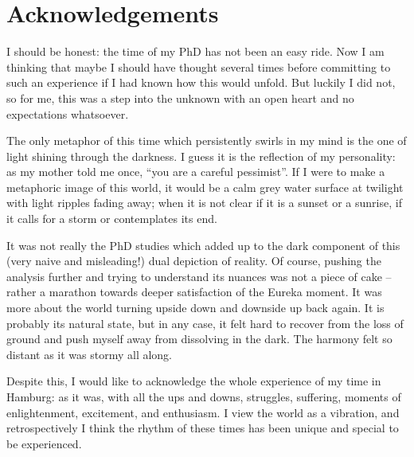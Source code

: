 \thispagestyle{empty}
\vspace{-3cm}
\section*{\centering Acknowledgements}

I should be honest: the time of my PhD has not been an easy ride. Now I am thinking that maybe I should have thought several times before committing to such an experience if I had known how this would unfold. But luckily I did not, so for me, this was a step into the unknown with an open heart and no expectations whatsoever.

The only metaphor of this time which persistently swirls in my mind is the one of light shining through the darkness. I guess it is the reflection of my personality: as my mother told me once, \enquote{you are a careful pessimist}. If I were to make a metaphoric image of this world, it would be a calm grey water surface at twilight with light ripples fading away; when it is not clear if it is a sunset or a sunrise, if it calls for a storm or contemplates its end.

It was not really the PhD studies which added up to the dark component of this (very naive and misleading!) dual depiction of reality. Of course, pushing the analysis further and trying to understand its nuances was not a piece of cake -- rather a marathon towards deeper satisfaction of the Eureka moment. It was more about the world turning upside down and downside up back again. It is probably its natural state, but in any case, it felt hard to recover from the loss of ground and push myself away from dissolving in the dark. The harmony felt so distant as it was stormy all along.

Despite this, I would like to acknowledge the whole experience of my time in Hamburg: as it was, with all the ups and downs, struggles, suffering, moments of enlightenment, excitement, and enthusiasm. I view the world as a vibration, and retrospectively I think the rhythm of these times has been unique and special to be experienced.

